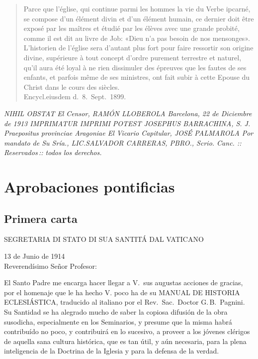 \raggedbottom{} \documentclass[12pt, a4paper]{book}
\begin{document}
\begin{quotation}
  Parce que l'église, qui continue parmi les hommes la vie du Verbe ipcarné, se compose d'un élément divin et d'un élément humain, ce dernier doit être exposé par les maîtres et étudié par les élèves avec une grande probité, comme il est dit au livre de Job: «Dieu n'a pas besoin de nos mensonges». L'historien de l'église sera d'autant plus fort pour faire ressortir son origine divine, supérieure à tout concept d'ordre purement terrestre et naturel, qu'il aura été loyal à ne rien dissimuler des épreuves que les fautes de ses enfants, et parfois même de ses ministres, ont fait subir à cette Epouse du Christ dans le cours des siècles.\\
  Encycl.\@ eiusdem d.\ 8.\ Sept.\ 1899.
\end{quotation}
\textit{
  \noindent NIHIL OBSTAT El Censor, RAMÓN LLOBEROLA Barcelona, 22 de Diciembre de 1913 IMPRIMATUR IMPRIMI POTEST JOSEPHUS BARRACHINA, S. J. Praepositus provinciae Aragoniae El Vicario Capitular, JOSÉ PALMAROLA Por mandato de Su Sría., LIC.\@ SALVADOR CARRERAS, PBRO., Scrio. Canc. \quad::\, Reservados\,:: \quad todos los derechos.
}
\newpage
\section{Aprobaciones pontificias}
\subsection{Primera carta}
\begin{center}
  \large SEGRETARIA DI STATO DI SUA SANTITÁ DAL VATICANO
\end{center}
\begin{flushright}
  13 de Junio de 1914\\
  Reverendísimo Señor Profesor:
\end{flushright}

El Santo Padre me encarga hacer llegar a V.\ sus augustas acciones de gracias, por el homenaje que le ha hecho V. poco ha de su MANUAL DE HISTORIA ECLESIÁSTICA, traducido al italiano por el Rev.\, Sac.\, Doctor G.\,B.\, Pagnini. Su Santidad se ha alegrado mucho de saber la copiosa difusión de la obra susodicha, especialmente en los Seminarios, y presume que la misma habrá contribuído no poco, y contribuirá en lo sucesivo, a proveer a los jóvenes clérigos de aquella sana cultura histórica, que es tan útil, y aún necesaria, para la plena inteligencia de la Doctrina de la Iglesia y para la defensa de la verdad.
\end{document}
